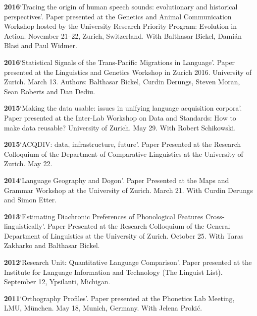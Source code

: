 \documentclass[11pt]{article}
\newcommand{\hangpara}{
 \setlength{\parindent}{0in} %
 \hangindent=0.42in %
}
\begin{document}
\hangpara
\vskip 6pt
{\bf 2016}\hspace{1ex}`Tracing the origin of human speech sounds: evolutionary and historical perspectives'. Paper presented at the Genetics and Animal Communication Workshop hosted by the University Research Priority Program: Evolution in Action. November 21--22, Zurich, Switzerland. With Balthasar Bickel, Dami{\'a}n Blasi and Paul Widmer.

\hangpara
\vskip 6pt
{\bf 2016}\hspace{1ex}`Statistical Signals of the Trans-Pacific Migrations in Language'. Paper presented at the Linguistics and Genetics Workshop in Zurich 2016. University of Zurich. March 13. Authors: Balthasar Bickel, Curdin Derungs, Steven Moran, Sean Roberts and Dan Dediu.

\hangpara
\vskip 6pt
{\bf 2015}\hspace{1ex}`Making the data usable: issues in unifying language acquisition corpora'. Paper presented at the Inter-Lab Workshop on Data and Standards: How to make data reusable? University of Zurich. May 29. With Robert Schikowski.

\vskip 6pt
\hangpara
{\bf 2015}\hspace{1ex}`ACQDIV: data, infrastructure, future'. Paper Presented at the Research Colloquium of the Department of Comparative Linguistics at the University of Zurich. May 22.

\vskip 6pt
\hangpara
{\bf 2014}\hspace{1ex}`Language Geography and Dogon'. Paper Presented at the Maps and Grammar Workshop at the University of Zurich. March 21. With Curdin Derungs and Simon Etter.

\vskip 6pt
\hangpara
{\bf 2013}\hspace{1ex}`Estimating Diachronic Preferences of Phonological Features Cross-linguistically'. Paper Presented at the Research Colloquium of the General Department of Linguistics at the University of Zurich. October 25. With Taras Zakharko and Balthasar Bickel.

\vskip 6pt
\hangpara
{\bf 2012}\hspace{1ex}`Research Unit: Quantitative Language Comparison'. Paper presented at the Institute for Language Information and Technology (The Linguist List). September 12, Ypsilanti, Michigan.

\vskip 6pt
\hangpara
{\bf 2011}\hspace{1ex}`Orthography Profiles'. Paper presented at the Phonetics Lab Meeting, LMU, M{\"u}nchen. May 18, Munich, Germany. With Jelena Proki{\'c}.
\end{document}
